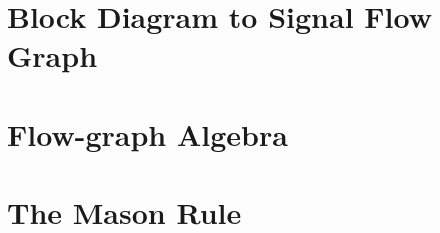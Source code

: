 \section[Block to Flow-graph]{Block Diagram to Signal Flow Graph}

\blindtext

\section[Flow-graph Algebra]{Flow-graph Algebra}

\blindtext

\section{The Mason Rule}

\blindtext

